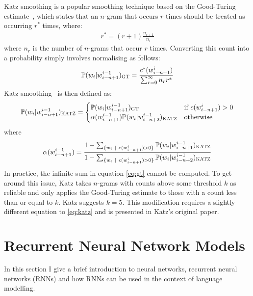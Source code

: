 \documentclass[a4paper, 12pt]{report}
\begin{document}
Katz smoothing is a popular smoothing technique based on the Good-Turing estimate~\cite{good_turing:good1953}, which states that an $n$-gram that occurs $r$ times should be treated as occurring $r^*$ times, where:
\begin{gather}
	r^* = (r + 1)\frac{n_{r + 1}}{n_r}
\end{gather}
where $n_r$ is the number of $n$-grams that occur $r$ times. Converting this count into a probability simply involves normalising as follows:
\begin{gather} \label{eq:gt}
	\mathbb{P}(w_i | w_{i - n + 1}^{i - 1})_{\text{\scshape GT}} = \frac{c^*(w_{i - n + 1}^{i})}{\sum_{r = 0}^\infty n_r r^*}
\end{gather}
Katz smoothing~\cite{katz_smoothing:katz1987} is then defined as:
\begin{gather} \label{eq:katz}
	\mathbb{P}(w_i | w_{i - n + 1}^{i - 1})_{\text{\scshape KATZ}} = \begin{cases}
		\mathbb{P}(w_i | w_{i - n + 1}^{i - 1})_{\text{\scshape GT}} &\text{if }c(w_{i - n + 1}^i) > 0 \\
		\alpha(w_{i - n + 1}^{i - 1})\mathbb{P}(w_i | w_{i - n + 2}^{i - 1})_{\text{\scshape KATZ}} &\text{otherwise}
	\end{cases}
\end{gather}
where
\begin{gather}
	\alpha(w_{i - n + 1}^{i - 1}) = \frac{1 - \sum_{\{w_i\ |\ c(w_{i - n + 1}^i) > 0\}} \mathbb{P}(w_i | w_{i - n + 1}^{i - 1})_{\text{\scshape KATZ}}}{1 - \sum_{\{w_i\ |\ c(w_{i - n + 1}^i) > 0\}} \mathbb{P}(w_i | w_{i - n + 2}^{i - 1})_{\text{\scshape KATZ}}}
\end{gather}
In practice, the infinite sum in equation \ref{eq:gt} cannot be computed. To get around this issue, Katz takes $n$-grams with counts above some threshold $k$ as reliable and only applies the Good-Turing estimate to those with a count less than or equal to $k$. Katz suggests $k = 5$. This modification requires a slightly different equation to \ref{eq:katz} and is presented in Katz's original paper.

\section{Recurrent Neural Network Models}

In this section I give a brief introduction to neural networks, recurrent neural networks (RNNs) and how RNNs can be used in the context of language modelling.
\end{document}

